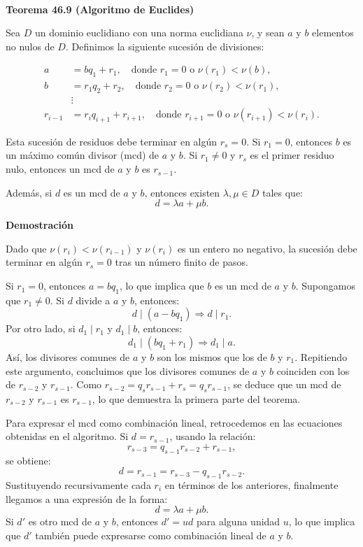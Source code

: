 \\
\noindent
\textbf{Teorema 46.9 (Algoritmo de Euclides)}

Sea $D$ un dominio euclidiano con una norma euclidiana $\nu$, y sean $a$ y $b$ elementos no nulos de $D$. Definimos la siguiente sucesión de divisiones:

\begin{align*}
    a &= bq_1 + r_1, \quad \text{donde } r_1 = 0 \text{ o } \nu(r_1) < \nu(b), \\
    b &= r_1 q_2 + r_2, \quad \text{donde } r_2 = 0 \text{ o } \nu(r_2) < \nu(r_1), \\
    &\vdots \\
    r_{i-1} &= r_i q_{i+1} + r_{i+1}, \quad \text{donde } r_{i+1} = 0 \text{ o } \nu(r_{i+1}) < \nu(r_i).
\end{align*}

Esta sucesión de residuos debe terminar en algún $r_s = 0$. Si $r_1 = 0$, entonces $b$ es un máximo común divisor (mcd) de $a$ y $b$. Si $r_1 \neq 0$ y $r_s$ es el primer residuo nulo, entonces un mcd de $a$ y $b$ es $r_{s-1}$.

Además, si $d$ es un mcd de $a$ y $b$, entonces existen $\lambda, \mu \in D$ tales que:
\[
    d = \lambda a + \mu b.
\]

\textbf{Demostración}

Dado que $\nu(r_i) < \nu(r_{i-1})$ y $\nu(r_i)$ es un entero no negativo, la sucesión debe terminar en algún $r_s = 0$ tras un número finito de pasos.

Si $r_1 = 0$, entonces $a = bq_1$, lo que implica que $b$ es un mcd de $a$ y $b$. Supongamos que $r_1 \neq 0$. Si $d$ divide a $a$ y $b$, entonces:
\[
    d \mid (a - bq_1) \Rightarrow d \mid r_1.
\]
Por otro lado, si $d_1 \mid r_1$ y $d_1 \mid b$, entonces:
\[
    d_1 \mid (bq_1 + r_1) \Rightarrow d_1 \mid a.
\]
Así, los divisores comunes de $a$ y $b$ son los mismos que los de $b$ y $r_1$. Repitiendo este argumento, concluimos que los divisores comunes de $a$ y $b$ coinciden con los de $r_{s-2}$ y $r_{s-1}$. Como $r_{s-2} = q_s r_{s-1} + r_s = q_s r_{s-1}$, se deduce que un mcd de $r_{s-2}$ y $r_{s-1}$ es $r_{s-1}$, lo que demuestra la primera parte del teorema.

Para expresar el mcd como combinación lineal, retrocedemos en las ecuaciones obtenidas en el algoritmo. Si $d = r_{s-1}$, usando la relación:
\[
    r_{s-3} = q_{s-1} r_{s-2} + r_{s-1},
\]
se obtiene:
\[
    d = r_{s-1} = r_{s-3} - q_{s-1} r_{s-2}.
\]
Sustituyendo recursivamente cada $r_i$ en términos de los anteriores, finalmente llegamos a una expresión de la forma:
\[
    d = \lambda a + \mu b.
\]
Si $d'$ es otro mcd de $a$ y $b$, entonces $d' = u d$ para alguna unidad $u$, lo que implica que $d'$ también puede expresarse como combinación lineal de $a$ y $b$.

